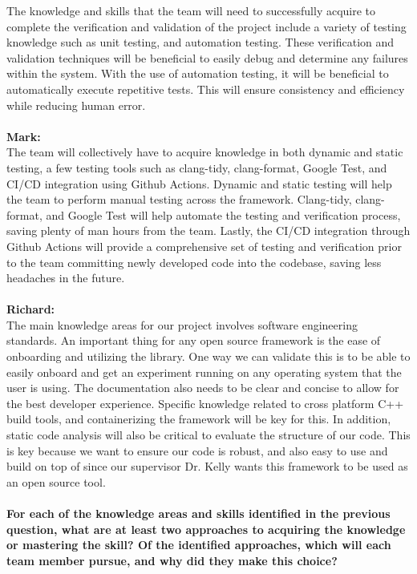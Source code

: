 \documentclass[12pt, titlepage]{article}
\begin{document}
    \noindent The knowledge and skills that the team will need to successfully acquire to complete the verification and validation of the project include a variety of testing knowledge such as unit testing, and automation testing. These verification and validation techniques will be beneficial to easily debug and determine any failures within the system. With the use of automation testing, it will be beneficial to automatically execute repetitive tests. This will ensure consistency and efficiency while reducing human error.
\\\\
     \textbf{Mark:}\\
    
     \noindent The team will collectively have to acquire knowledge in both dynamic and static testing, a few testing tools such as clang-tidy, clang-format, Google Test, and CI/CD integration using Github Actions. Dynamic and static testing will help the team to perform manual testing across the framework. Clang-tidy, clang-format, and Google Test will help automate the testing and verification process, saving plenty of man hours from the team. Lastly, the CI/CD integration through Github Actions will provide a comprehensive set of testing and verification prior to the team committing newly developed code into the codebase, saving less headaches in the future.
\\\\
    \textbf{Richard:}\\

    \noindent The main knowledge areas for our project involves software engineering standards. An important thing for any open source framework is the ease of onboarding and utilizing the library. One way we can validate this is to be able to easily onboard and get an experiment running on any operating system that the user is using. The documentation also needs to be clear and concise to allow for the best developer experience. Specific knowledge related to cross platform C++ build tools, and containerizing the framework will be key for this. In addition, static code analysis will also be critical to evaluate the structure of our code. This is key because we want to ensure our code is robust, and also easy to use and build on top of since our supervisor Dr. Kelly wants this framework to be used as an open source tool.
\\\\
\textbf{For each of the knowledge areas and skills identified in the previous
  question, what are at least two approaches to acquiring the knowledge or
  mastering the skill?  Of the identified approaches, which will each team
  member pursue, and why did they make this choice?}
\\\\
\end{document}
